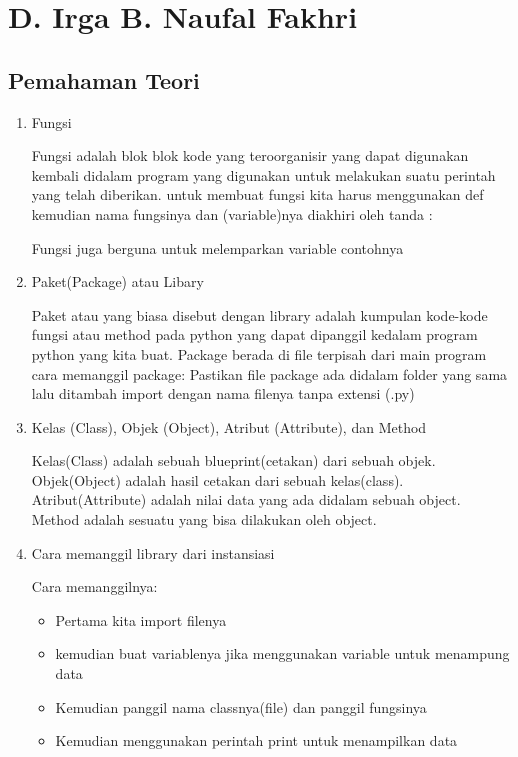 ﻿\section{D. Irga B. Naufal Fakhri}
\subsection{Pemahaman Teori}
\begin{enumerate}
\item Fungsi

Fungsi adalah blok blok kode yang teroorganisir yang dapat digunakan kembali didalam program yang digunakan untuk melakukan suatu perintah yang telah diberikan.
untuk membuat fungsi kita harus menggunakan def kemudian nama fungsinya dan (variable)nya diakhiri oleh tanda :

Fungsi juga berguna untuk melemparkan variable contohnya


\item Paket(Package) atau Libary

Paket atau yang biasa disebut dengan library adalah kumpulan kode-kode fungsi atau method pada python yang dapat dipanggil kedalam program python yang kita buat. Package berada di file terpisah dari main program
cara memanggil package: Pastikan file package ada didalam folder yang sama lalu ditambah import dengan nama filenya tanpa extensi (.py)


\item Kelas (Class), Objek (Object), Atribut (Attribute), dan Method

Kelas(Class) adalah sebuah blueprint(cetakan) dari sebuah objek.
Objek(Object) adalah hasil cetakan dari sebuah kelas(class).
Atribut(Attribute) adalah nilai data yang ada didalam sebuah object.
Method adalah sesuatu yang bisa dilakukan oleh object.



\item Cara memanggil library dari instansiasi

Cara memanggilnya:
\begin{itemize}
	\item Pertama kita import filenya
	\item kemudian buat variablenya jika menggunakan variable untuk menampung data
	\item Kemudian panggil nama classnya(file) dan panggil fungsinya
	\item Kemudian menggunakan perintah print untuk menampilkan data
\end{itemize}
 



\end{enumerate}
